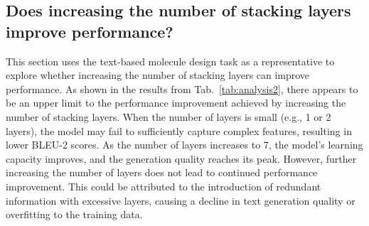 

\subsection{Does increasing the number of stacking layers improve performance?}

This section uses the text-based molecule design task as a representative to explore whether increasing the number of stacking layers can improve performance.  
As shown in the results from Tab.~\ref{tab:analysis2}, there appears to be an upper limit to the performance improvement achieved by increasing the number of stacking layers. 
When the number of layers is small (e.g., 1 or 2 layers), the model may fail to sufficiently capture complex features, resulting in lower BLEU-2 scores. As the number of layers increases to 7, the model's learning capacity improves, and the generation quality reaches its peak. However, further increasing the number of layers does not lead to continued performance improvement. This could be attributed to the introduction of redundant information with excessive layers, causing a decline in text generation quality or overfitting to the training data.


